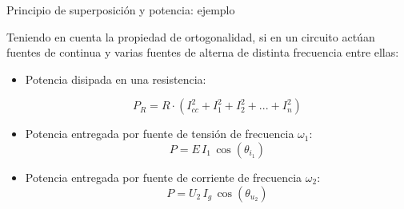 \documentclass[aspectratio=169, usenames,svgnames,dvipsnames]{beamer}
\begin{document}

\begin{frame}{Principio de superposición y potencia: \hspace{3mm}ejemplo}

    \vspace{3mm}
    Teniendo en cuenta la propiedad de ortogonalidad, si en un circuito actúan \alert{fuentes de continua} y \alert{varias fuentes de alterna} de \alert{distinta frecuencia} entre ellas:

    \vspace{2mm}
    \begin{itemize}
        \item Potencia disipada en una \alert{resistencia}:

        \vspace{-4mm}
        \begin{equation*}
            {P_R=R\cdot\left(I_{cc}^2+I_1^2+I_2^2+...+I_n^2 \right)}
        \end{equation*}

        \vspace{2mm}
        \item \alert{Potencia entregada por fuente de tensión} de frecuencia $\omega_1$: 
        \begin{equation*}
            {P=E\,I_1\,\cos(\theta_{i_1})}
        \end{equation*}

        \vspace{2mm}
        \item \alert{Potencia entregada por fuente de corriente} de frecuencia $\omega_2$: 
        \begin{equation*}
            {P=U_2\,I_{g}\,\cos(\theta_{u_2})}
        \end{equation*}
        
        \vspace*{2mm}
    \end{itemize}
\end{frame}
\end{document}
